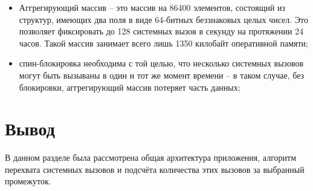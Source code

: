 \begin{itemize}
	\item Аггрегирующий массив -- это массив на 86400 элементов, состоящий из структур, имеющих два поля в виде 64-битных беззнаковых целых чисел. Это позволяет фиксировать до 128 системных вызов в секунду на протяжении 24 часов. Такой массив занимает всего лишь 1350 килобайт оперативной памяти;
	
	\item спин-блокировка необходима с той целью, что несколько системных вызовов могут быть вызываны в один и тот же момент времени -- в таком случае, без блокировки, аггрегирующий массив потеряет часть данных;
\end{itemize}

\section*{Вывод}

В данном разделе была рассмотрена общая архитектура приложения, алгоритм перехвата системных вызовов и подсчёта количества этих вызовов за выбранный промежуток.


